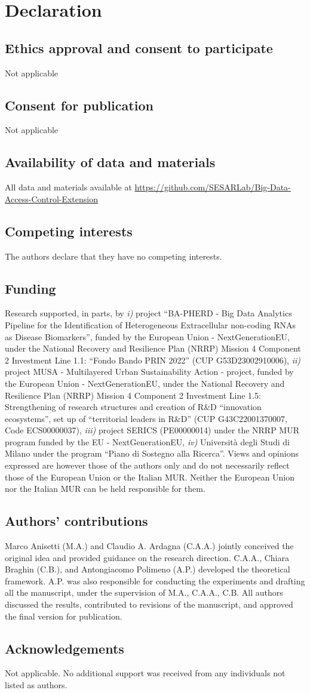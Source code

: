 \section{Declaration}
\subsection{Ethics approval and consent to participate}
Not applicable
\subsection{Consent for publication}
Not applicable
\subsection{Availability of data and materials}
All data and materials available at \url{https://github.com/SESARLab/Big-Data-Access-Control-Extension}
\subsection{Competing interests}
The authors declare that they have no competing interests.
\subsection{Funding}
Research supported, in parts, by \emph{i)} project ``BA-PHERD - Big Data Analytics Pipeline for the Identification of Heterogeneous Extracellular non-coding RNAs as Disease Biomarkers'', funded by the European Union - NextGenerationEU, under the National Recovery and Resilience Plan (NRRP) Mission 4 Component 2 Investment Line 1.1: “Fondo Bando PRIN 2022” (CUP G53D23002910006), \emph{ii)} project MUSA - Multilayered Urban Sustainability Action - project, funded by the European Union - NextGenerationEU, under the National Recovery and Resilience Plan (NRRP) Mission 4 Component 2 Investment Line 1.5: Strengthening of research structures and creation of R\&D ``innovation ecosystems'', set up of ``territorial leaders in R\&D'' (CUP  G43C22001370007, Code ECS00000037), \emph{iii)} project SERICS (PE00000014) under the NRRP MUR program funded by the EU - NextGenerationEU, \emph{iv)} Università degli Studi di Milano under the program ``Piano di Sostegno alla Ricerca''. Views and opinions expressed are however those of the authors only and do not necessarily reflect those of the European Union or the Italian MUR. Neither the European Union nor the Italian MUR can be held responsible for them.
\subsection{Authors' contributions}
Marco Anisetti (M.A.) and Claudio A. Ardagna (C.A.A.) jointly conceived the original idea and provided guidance on the research direction. C.A.A., Chiara Braghin (C.B.), and Antongiacomo Polimeno (A.P.) developed the theoretical framework. A.P. was also responsible for conducting the experiments and drafting all the manuscript, under the supervision of M.A., C.A.A., C.B. All authors discussed the results, contributed to revisions of the manuscript, and approved the final version for publication.

\subsection{Acknowledgements}
Not applicable. No additional support was received from any individuals not listed as authors.